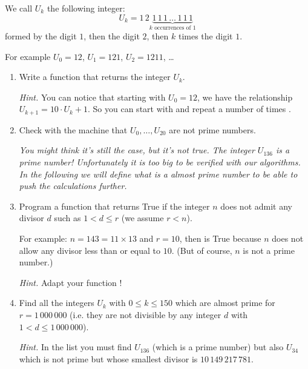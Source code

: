 \documentclass[11pt,class=report,crop=false]{standalone}
\begin{document}

\begin{activite}


We call $U_k$ the following integer:
$$U_k = 1\,2 \underbrace{1\,1\,1\,\ldots\,1\,1\,1}_{k \text{ occurrences of } 1}$$
formed by the digit $1$, then the digit $2$, then $k$ times the digit $1$.

For example $U_0 = 12$, $U_1 = 121$, $U_2 = 1211$, \ldots




\begin{enumerate}
  \item Write a function  that returns the integer $U_k$.
  
  \emph{Hint.} You can notice that starting with $U_0=12$, we have the relationship
  $U_{k+1} = 10 \cdot U_k + 1$. So you can start with  and repeat a number of times .
  
  \item Check with the machine that $U_0,\ldots,U_{20}$ are not prime numbers. 
  
  \medskip
  
 \emph{You might think it's still the case, but it's not true. The integer $U_{136}$ is a prime number! Unfortunately it is too big to be verified with our algorithms. In the following we will define what is a \emph{almost prime number} to be able to push the calculations further.}
  
  \item Program a function  that returns \og{}True\fg{} if the integer $n$ does not admit any divisor $d$ such as $1< d \le r$ (we assume $r<n$). 
  
  For example: $n = 143 = 11 \times 13$ and $r=10$, then  is
  \og{}True\fg{} because $n$ does not allow any divisor less than or equal to $10$. (But of course, $n$ is not a prime number.)
  
  \emph{Hint.} Adapt your function !
  
  \item Find all the integers $U_k$ with $0\le k \le 150$ which are almost prime for 
  $r = 1 \,000\,000$ (i.e. they are not divisible by any integer $d$ with $1<d \le 1\,000\,000$).
  
  \emph{Hint.} In the list you must find $U_{136}$ (which is a prime number) but also $U_{34}$ which is not prime but whose smallest divisor is
  $10\,149\,217\,781$.
\end{enumerate}   
     
\end{activite}
\end{document}
